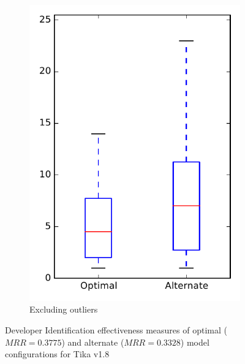 \begin{figure}
\begin{subfigure}{.4\textwidth}
        \includegraphics[height=0.4\textheight]{figures/combo/dit_rq1_tika_no_outlier}
        \caption{Excluding outliers}\label{fig:combo:dit:rq1:tika_no_outlier}
    \end{subfigure}
\caption[Developer Identification effectiveness measures of optimal and alternate model configurations for Tika v1.8]%
{Developer Identification effectiveness measures of optimal ($MRR=0.3775$) and alternate ($MRR=0.3328$) model configurations for Tika v1.8}
\label{fig:combo:dit:rq1:tika}
\end{figure}
